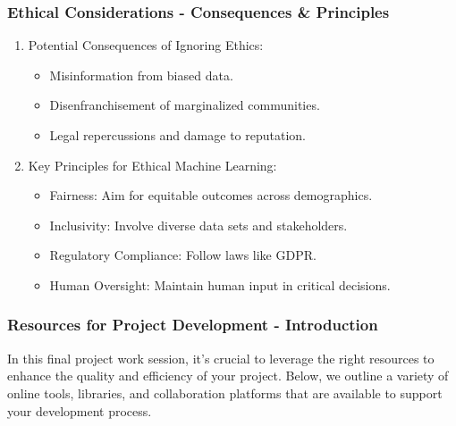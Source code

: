 \documentclass[aspectratio=169]{beamer}
\begin{document}
\begin{frame}[fragile]
    \frametitle{Ethical Considerations - Consequences & Principles}
    \begin{enumerate}
        \item Potential Consequences of Ignoring Ethics:
            \begin{itemize}
                \item Misinformation from biased data.
                \item Disenfranchisement of marginalized communities.
                \item Legal repercussions and damage to reputation.
            \end{itemize}
        \item Key Principles for Ethical Machine Learning:
            \begin{itemize}
                \item Fairness: Aim for equitable outcomes across demographics.
                \item Inclusivity: Involve diverse data sets and stakeholders.
                \item Regulatory Compliance: Follow laws like GDPR.
                \item Human Oversight: Maintain human input in critical decisions.
            \end{itemize}
    \end{enumerate}
\end{frame}

\begin{frame}[fragile]
    \frametitle{Resources for Project Development - Introduction}
    In this final project work session, it's crucial to leverage the right resources to enhance the quality and efficiency of your project. Below, we outline a variety of online tools, libraries, and collaboration platforms that are available to support your development process.
\end{frame}
\end{document}
